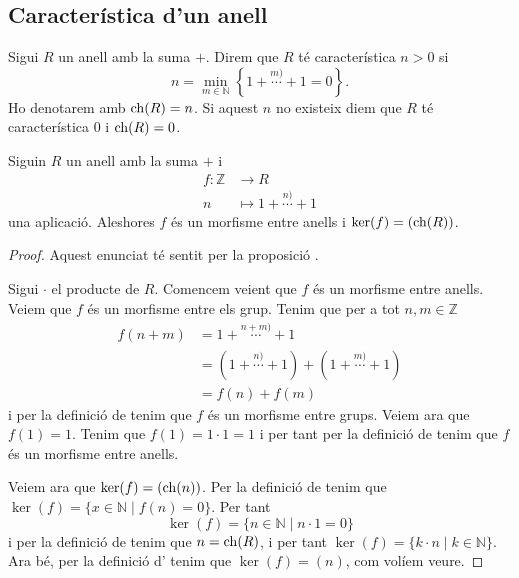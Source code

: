 \documentclass[../../Main.tex]{subfiles}
\begin{document}
	\subsection{Característica d'un anell}
	\begin{definition}[Característica]
		\label{def:característica d'un anell}
		Sigui \(R\) un anell amb la suma \(+\). Direm que \(R\) té característica \(n>0\) si \[n=\min_{m\in\mathbb{N}}\left\{1+\overset{m)}{\cdots}+1=0\right\}.\]
		Ho denotarem amb \(\operatorname{ch}(R)=n\). Si aquest \(n\) no existeix diem que \(R\) té característica \(0\) i \(\operatorname{ch}(R)=0\).
	\end{definition}
	\begin{proposition}
		\label{prop:morfisme entre anells per trobar característica}
		Siguin \(R\) un anell amb la suma \(+\) i
		\begin{align*}
		f\colon\mathbb{Z}&\longrightarrow R\\
		n&\longmapsto 1+\overset{n)}{\cdots}+1
		\end{align*}
		una aplicació. Aleshores \(f\) és un morfisme entre anells i \(\operatorname{ker}(f)=(\operatorname{ch}(R))\).
		\begin{proof}
			Aquest enunciat té sentit per la proposició . %
			
			Sigui \(\cdot\) el producte de \(R\). Comencem veient que \(f\) és un morfisme entre anells. Veiem que \(f\) és un morfisme entre els grup. Tenim que per a tot \(n,m\in\mathbb{Z}\)
			\begin{align*}
				f(n+m)&=1+\overset{n+m)}{\cdots}+1\\
				&=(1+\overset{n)}{\cdots}+1)+(1+\overset{m)}{\cdots}+1)\\
				&=f(n)+f(m)
			\end{align*}
			i per la definició de  tenim que \(f\) és un morfisme entre grups. Veiem ara que \(f(1)=1\). Tenim que \(f(1)=1\cdot1=1\) i per tant per la definició de  tenim que \(f\) és un morfisme entre anells.
			
			Veiem ara que \(\operatorname{ker}(f)=(\operatorname{ch}(n))\). Per la definició de  tenim que \(\ker(f)=\{x\in\mathbb{N}\mid f(n)=0\}\).	Per tant
			\[\ker(f)=\{n\in\mathbb{N}\mid n\cdot1=0\}\]
			i per la definició de  tenim que \(n=\operatorname{ch}(R)\), i per tant \(\ker(f)=\{k\cdot n\mid k\in\mathbb{N}\}\). Ara bé, per la definició d' tenim que \(\ker(f)=(n)\), com volíem veure.
		\end{proof}
	\end{proposition}
\end{document}
